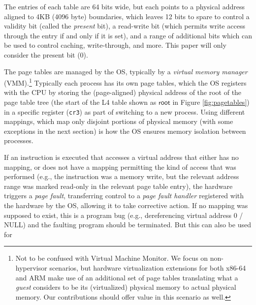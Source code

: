 The entries  of each table are 64 bits wide,
but each points to a physical address aligned to 4KB (4096 byte) boundaries, which leaves 12 bits to spare to 
control a validity bit (called the \emph{present} bit), a read-write bit (which permits write access through the entry if and only if it is set),
and a range of additional bits which can be used to control caching, write-through, and more.
This paper will only consider the present bit (0).

The page tables are managed by the OS, typically by a \emph{virtual memory manager} (VMM).\footnote{Not to be confused with Virtual 
Machine Monitor. We focus on non-hypervisor scenarios, but hardware virtualization extensions for both 
x86-64 and ARM make use of an additional set of page tables translating what a \emph{guest} considers to be its 
(virtualized) physical memory to actual physical memory. Our contributions should offer value in this scenario as well.}
Typically each process has its own 
page tables, which the OS registers with the CPU by storing the (page-aligned)
physical address of the root of the page table tree (the start of the L4 table shown as $\mathsf{root}$ in Figure \ref{fig:pagetables}) in a specific register (\texttt{cr3}) as part of switching to a new process. 
Using different mappings, which map only disjoint portions of physical memory (with some exceptions in the next section) 
is how the OS ensures memory isolation between processes.

If an instruction is executed that accesses a virtual address that either has no mapping, or does not have a mapping permitting 
the kind of access that was performed (e.g., the instruction was a memory write, but the relevant address range was marked read-only in
the relevant page table entry), the hardware triggers a \emph{page fault}, transferring control to a \emph{page fault handler} registered 
with the hardware by the OS, allowing it to take corrective action.
If no mapping was supposed to exist, this is a program bug (e.g., dereferencing virtual address 0 / NULL)
and the faulting program should be terminated. But this can also be used for

